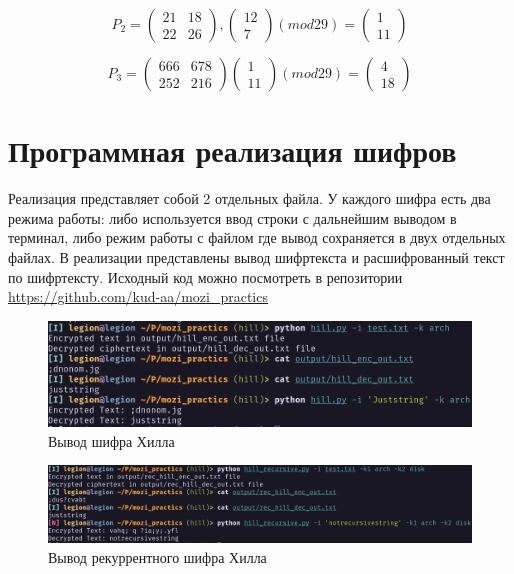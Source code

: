 \documentclass[a4paper]{article}
\begin{document}
\[
    P_2=
    \begin{pmatrix}
        21 & 18 \\
        22 & 26
    \end{pmatrix},
    \begin{pmatrix}
        12 \\
        7
    \end{pmatrix}
    (mod 29) =
    \begin{pmatrix}
        1 \\
        11
    \end{pmatrix}
\]

\[
    P_3=
    \begin{pmatrix}
        666 & 678 \\
        252 & 216
    \end{pmatrix}
    \begin{pmatrix}
        1 \\
        11
    \end{pmatrix}
    (mod 29) =
    \begin{pmatrix}
        4 \\
        18
    \end{pmatrix}
\]

\section{Программная реализация шифров}
Реализация представляет собой 2 отдельных файла. У каждого шифра есть два
режима работы: либо используется ввод строки с дальнейшим выводом в терминал, либо режим работы с файлом где вывод сохраняется в двух отдельных файлах. В реализации представлены вывод шифртекста и расшифрованный текст по шифртексту. Исходный код можно посмотреть в репозитории \url{https://github.com/kud-aa/mozi_practics}

\begin{figure}[h]
    \centering
    \includegraphics[width=\textwidth]{hill_1.png}
    \caption{Вывод шифра Хилла}
\end{figure}

\begin{figure}[h]
    \centering
    \includegraphics[width=\textwidth]{hill_2.png}
    \caption{Вывод рекуррентного шифра Хилла}
\end{figure}
\end{document}
